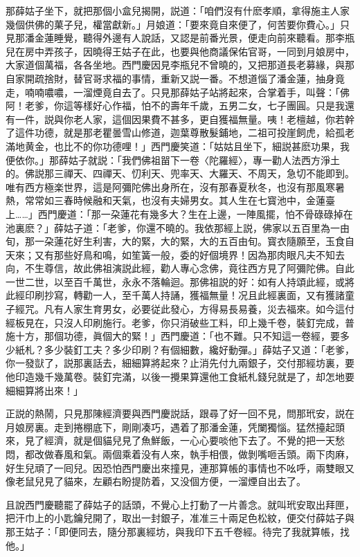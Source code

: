 那薛姑子坐下，就把那個小盒兒揭開，説道：「咱們沒有什麽孝順，拿得施主人家幾個供佛的菓子兒，權當獻新。」月娘道：「要來竟自來便了，何苦要你費心。」只見那潘金蓮睡覺，聽得外邊有人說話，又認是前番光景，便走向前來聽看。那李瓶兒在房中弄孩子，因曉得王姑子在此，也要與他商議保佑官哥，一同到月娘房中，大家道個萬福，各各坐地。西門慶因見李瓶兒不曾曉的，又把那道長老募緣，與那自家開疏捨財，替官哥求福的事情，重新又説一番。不想道惱了潘金蓮，抽身竟走，喃喃噥噥，一溜煙竟自去了。只見那薛姑子站將起來，合掌着手，叫聲：「佛阿！老爹，你這等樣好心作福，怕不的壽年千歲，五男二女，七子團圓。只是我還有一件，説與你老人家，這個因果費不甚多，更自獲福無量。咦！老檀越，你若幹了這件功德，就是那老瞿曇雪山修道，迦葉尊散髮鋪地，二祖可投崖飼虎，給孤老滿地黄金，也比不的你功德哩！」西門慶笑道：「姑姑且坐下，細説甚麽功果，我便依你。」那薛姑子就説：「我們佛祖㽞下一卷〈陀羅經〉，專一勸人法西方淨土的。佛説那三禪天、四禪天、忉利天、兜率天、大羅天、不周天，急切不能即到。唯有西方極楽世界，這是阿彌陀佛出身所在，沒有那春夏秋冬，也沒有那風寒暑熱，常常如三春時候融和天氣，也沒有夫婦男女。其人生在七寳池中，金蓮臺上……」西門慶道：「那一朶蓮花有幾多大？生在上邊，一陣風擺，怕不骨碌碌掉在池裏麽？」薛姑子道：「老爹，你還不曉的。我依那經上説，佛家以五百里為一由旬，那一朶蓮花好生利害，大的緊，大的緊，大的五百由旬。寳衣隨願至，玉食自天來；又有那些好鳥和鳴，如笙簧一般，委的好個境界！因為那肉眼凡夫不知去向，不生尊信，故此佛祖演説此經，勸人專心念佛，竟往西方見了阿彌陀佛。自此一世二世，以至百千萬世，永永不落輪迴。那佛祖説的好：如有人持頌此經，或將此經印刷抄寫，轉勸一人，至千萬人持誦，獲福無量！况且此經裏面，又有獲諸童子經咒。凡有人家生育男女，必要従此發心，方得易長易養，災去福來。如今這付經板見在，只沒人印刷施行。老爹，你只消破些工料，印上幾千卷，裝釘完成，普施十方，那個功德，眞個大的緊！」西門慶道：「也不難。只不知這一卷經，要多少紙札？多少裝釘工夫？多少印刷？有個細數，纔好動彈。」薛姑子又道：「老爹，你一發獃了，説那裏話去，細細算將起來？止消先付九兩銀子，交付那經坊裏，要他印造幾千幾萬卷。裝釘完滿，以後一攪果算還他工食紙札錢兒就是了，却怎地要細細算將出來！」

正説的熱鬧，只見那陳經濟要與西門慶説話，跟尋了好一回不見，問那玳安，説在月娘房裏。走到捲棚底下，剛剛凑巧，遇着了那潘金蓮，凭闌獨惱。猛然擡起頭來，見了經濟，就是個貓兒見了魚鮮飯，一心心要啖他下去了。不覺的把一天愁悶，都改做春風和氣。兩個乘着没有人來，執手相偎，做剝嘴咂舌頭。兩下肉麻，好生兒頑了一囘兒。因恐怕西門慶出來撞見，連那算帳的事情也不吆呼，兩雙眼又像老鼠兒見了貓來，左顧右盼提防着，又没個方便，一溜煙自出去了。

且說西門慶聽罷了薛姑子的話頭，不覺心上打動了一片善念。就叫玳安取出拜匣，把汗巾上的小匙鑰兒開了，取出一封銀子，准准三十兩足色松紋，便交付薛姑子與那王姑子：「即便同去，隨分那裏經坊，與我印下五千卷經。待完了我就算帳，找他。」

